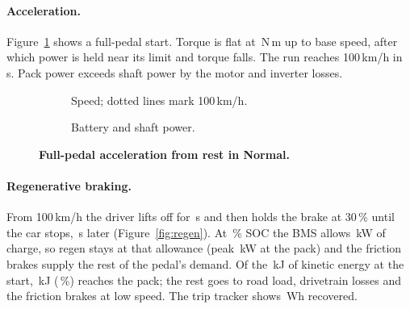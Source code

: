 \documentclass[10pt]{article}
\begin{document}
\paragraph{Acceleration.} Figure~\ref{fig:accel} shows a full-pedal start. Torque is flat at \ParMotorNm\,N\,m up to base speed, after which power is held near its limit and torque falls. The run reaches 100\,km/h in \ResZeroHundred\,s. Pack power exceeds shaft power by the motor and inverter losses.

\begin{figure}[!htbp]
\centering
\begin{subfigure}[t]{0.49\textwidth}
\caption{Speed; dotted lines mark 100\,km/h.}
\end{subfigure}\hfill
\begin{subfigure}[t]{0.49\textwidth}
\caption{Battery and shaft power.}
\end{subfigure}
\caption{\textbf{Full-pedal acceleration from rest in Normal.}}
\label{fig:accel}
\end{figure}

\paragraph{Regenerative braking.} From 100\,km/h the driver lifts off for \ResRegenLiftS\,s and then holds the brake at 30\,\% until the car stops, \ResRegenBrakeS\,s later (Figure~\ref{fig:regen}). At \ResRegenSocPct\,\% SOC the BMS allows \ResRegenAllowKw\,kW of charge, so regen stays at that allowance (peak \ResRegenPeakKw\,kW at the pack) and the friction brakes supply the rest of the pedal's demand. Of the \ResRegenKineticKj\,kJ of kinetic energy at the start, \ResRegenPackKj\,kJ (\ResRegenShare\,\%) reaches the pack; the rest goes to road load, drivetrain losses and the friction brakes at low speed. The trip tracker shows \ResRegenRecoveredWh\,Wh recovered.
\end{document}
